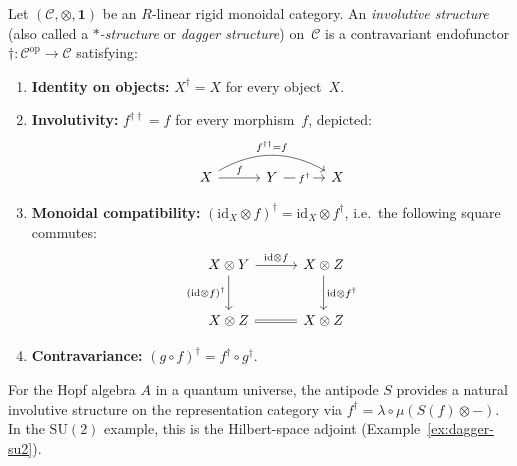 \begin{definition}
\label{def:involutive-structure}
\leanok
Let $(\mathcal{C}, \otimes, \mathbf{1})$ be an $R$-linear rigid monoidal
category.  An \emph{involutive structure} (also called a
\emph{$\ast$-structure} or \emph{dagger structure}) on~$\mathcal{C}$ is
a contravariant endofunctor
$\dagger \colon \mathcal{C}^{\mathrm{op}} \to \mathcal{C}$ satisfying:
\begin{enumerate}
  \item \textbf{Identity on objects:} $X^{\dagger} = X$ for every
        object~$X$.
  \item \textbf{Involutivity:} $f^{\dagger\dagger} = f$ for every
        morphism~$f$, depicted:
        \begin{equation}\label{eq:involutivity-cd}
        \begin{tikzcd}[column sep=3em]
          X \ar[r, "f"] \ar[rr, bend left=30, "f^{\dagger\dagger} = f"]
          & Y \ar[r, "f^{\dagger}"{description}]
          & X
        \end{tikzcd}
        \end{equation}
  \item \textbf{Monoidal compatibility:}
        $(\mathrm{id}_X \otimes f)^{\dagger}
        = \mathrm{id}_X \otimes f^{\dagger}$, i.e.\
        the following square commutes:
        \begin{equation}\label{eq:monoidal-dagger-cd}
        \begin{tikzcd}[row sep=2.5em, column sep=3em]
          X \otimes Y \ar[r, "\mathrm{id} \otimes f"]
            \ar[d, "(\mathrm{id} \otimes f)^{\dagger}"']
          & X \otimes Z \ar[d, "\mathrm{id} \otimes f^{\dagger}"] \\
          X \otimes Z \ar[r, equal]
          & X \otimes Z
        \end{tikzcd}
        \end{equation}
  \item \textbf{Contravariance:}
        $(g \circ f)^{\dagger} = f^{\dagger} \circ g^{\dagger}$.
\end{enumerate}
For the Hopf algebra $A$ in a quantum universe, the antipode $S$ provides
a natural involutive structure on the representation category via
$f^{\dagger} = \lambda \circ \mu(S(f) \otimes -)$.  In the
$\mathrm{SU}(2)$ example, this is the Hilbert-space adjoint
(Example~\ref{ex:dagger-su2}).
\end{definition}

